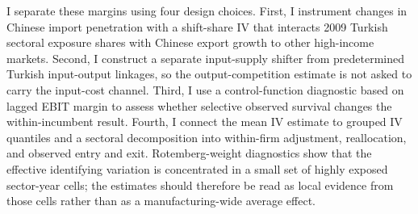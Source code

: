 ﻿\documentclass[12pt]{article}
\begin{document}
I separate these margins using four design choices. First, I instrument changes in Chinese import penetration with a shift-share IV that interacts 2009 Turkish sectoral exposure shares with Chinese export growth to other high-income markets. Second, I construct a separate input-supply shifter from predetermined Turkish input-output linkages, so the output-competition estimate is not asked to carry the input-cost channel. Third, I use a control-function diagnostic based on lagged EBIT margin to assess whether selective observed survival changes the within-incumbent result. Fourth, I connect the mean IV estimate to grouped IV quantiles and a sectoral decomposition into within-firm adjustment, reallocation, and observed entry and exit. Rotemberg-weight diagnostics show that the effective identifying variation is concentrated in a small set of highly exposed sector-year cells; the estimates should therefore be read as local evidence from those cells rather than as a manufacturing-wide average effect.
\end{document}
